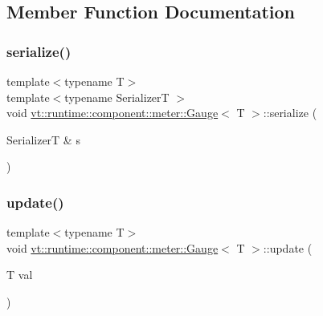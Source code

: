 \subsection{Member Function Documentation}
\mbox{\label{structvt_1_1runtime_1_1component_1_1meter_1_1_gauge_a5b4a65a1c46ee3d97e927dc6653d8d29}} 
\subsubsection{\texorpdfstring{serialize()}{serialize()}}
{\footnotesize\ttfamily template$<$typename T$>$ \\
template$<$typename SerializerT $>$ \\
void \hyperlink{structvt_1_1runtime_1_1component_1_1meter_1_1_gauge}{vt\+::runtime\+::component\+::meter\+::\+Gauge}$<$ T $>$\+::serialize (\begin{DoxyParamCaption}\item[{SerializerT \&}]{s }\end{DoxyParamCaption})\hspace{0.3cm}{\ttfamily [inline]}}

\mbox{\label{structvt_1_1runtime_1_1component_1_1meter_1_1_gauge_a60af475569c49b999e8fbc4c80a788ce}} 
\subsubsection{\texorpdfstring{update()}{update()}}
{\footnotesize\ttfamily template$<$typename T$>$ \\
void \hyperlink{structvt_1_1runtime_1_1component_1_1meter_1_1_gauge}{vt\+::runtime\+::component\+::meter\+::\+Gauge}$<$ T $>$\+::update (\begin{DoxyParamCaption}\item[{T}]{val }\end{DoxyParamCaption})\hspace{0.3cm}{\ttfamily [inline]}}



